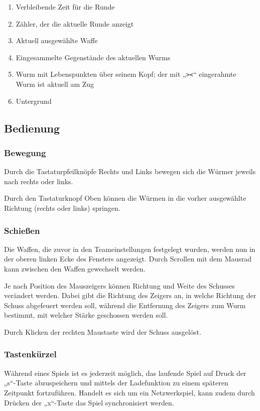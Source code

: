 \documentclass{scrreprt}
\begin{document}
\begin{enumerate}
 \item Verbleibende Zeit für die Runde
 \item Zähler, der die aktuelle Runde anzeigt
 \item Aktuell ausgewählte Waffe
 \item Eingesammelte Gegenstände des aktuellen Wurms
 \item Wurm mit Lebenspunkten über seinem Kopf; der mit „\texttt{><}“ eingerahmte Wurm ist aktuell am Zug
 \item Untergrund
\end{enumerate}

\subsection{Bedienung}

\subsubsection{Bewegung}

Durch die Tastaturpfeilknöpfe Rechts und Links bewegen sich die Würmer jeweils nach rechts oder links.

Durch den Tastaturknopf Oben können die Würmen in die vorher ausgewählte Richtung (rechts oder links) springen.

\subsubsection{Schießen}

Die Waffen, die zuvor in den Teameinstellungen festgelegt wurden, werden nun in der oberen linken Ecke des Fensters angezeigt.
Durch Scrollen mit dem Mausrad kann zwischen den Waffen gewechselt werden.

Je nach Position des Mauszeigers können Richtung und Weite des Schusses verändert werden. Dabei gibt die Richtung des Zeigers an, in welche Richtung der Schuss abgefeuert werden soll, während die Entfernung des Zeigers zum Wurm bestimmt, mit welcher Stärke geschossen werden soll.

Durch Klicken der rechten Maustaste wird der Schuss ausgelöst.

\subsubsection{Tastenkürzel}

Während eines Spiels ist es jederzeit möglich, das laufende Spiel auf Druck der „s“-Taste abzuspeichern und mittels der Ladefunktion zu einem späteren Zeitpunkt fortzuführen.
Handelt es sich um ein Netzwerkspiel, kann zudem durch Drücken der „x“-Taste das Spiel synchronisiert werden.
\end{document}
